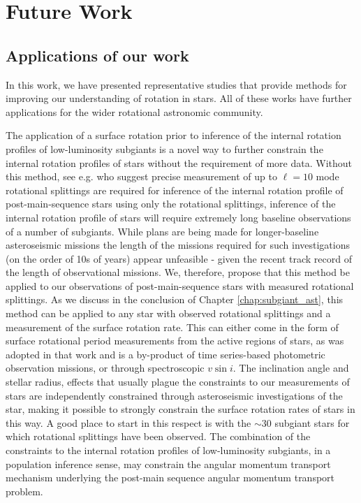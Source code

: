 \section{Future Work}

\subsection{Applications of our work}

In this work, we have presented representative studies that provide methods for improving our understanding of rotation in stars.
All of these works have further applications for the wider rotational astronomic community.

The application of a surface rotation prior to inference of the internal rotation profiles of low-luminosity subgiants is a novel way to further constrain the internal rotation profiles of stars without the requirement of more data.
Without this method, see e.g. \citet{albhorn} who suggest precise measurement of up to $\ell = 10$ mode rotational splittings are required for inference of the internal rotation profile of post-main-sequence stars using only the rotational splittings, inference of the internal rotation profile of stars will require extremely long baseline observations of a number of subgiants.
While plans are being made for longer-baseline asteroseismic missions \citep{haydn, plato, roman} the length of the missions required for such investigations (on the order of 10s of years) appear unfeasible - given the recent track record of the length of observational missions.
We, therefore, propose that this method be applied to our observations of post-main-sequence stars with measured rotational splittings.
As we discuss in the conclusion of Chapter \ref{chap:subgiant_ast}, this method can be applied to any star with observed rotational splittings and a measurement of the surface rotation rate.
This can either come in the form of surface rotational period measurements from the active regions of stars, as was adopted in that work and is a by-product of time series-based photometric observation missions, or through spectroscopic $v \sin{i}$.
The inclination angle and stellar radius, effects that usually plague the constraints to our measurements of stars are independently constrained through asteroseismic investigations of the star, making it possible to strongly constrain the surface rotation rates of stars in this way.
A good place to start in this respect is with the $\sim$30 subgiant stars for which rotational splittings have been observed.
The combination of the constraints to the internal rotation profiles of low-luminosity subgiants, in a population inference sense, may constrain the angular momentum transport mechanism underlying the post-main sequence angular momentum transport problem.

